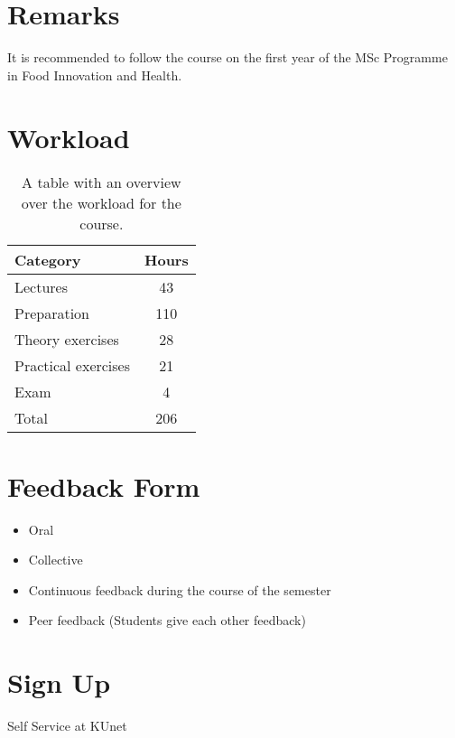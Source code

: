 \section{Remarks}
It is recommended to follow the course on the first year of the MSc Programme in Food Innovation and Health.

\section{Workload}
\begin{table}
    \centering
    \caption{A table with an overview over the workload for the course.}
    \label{tab:workload}
    \begin{tabular}{ l | c}
        \textbf{Category} & \textbf{Hours} \\ 
        \hline
        Lectures & 43 \\ 

        Preparation & 110 \\

        Theory exercises & 28 \\ 

        Practical exercises & 21 \\ 

        Exam & 4 \\ 
        \hline
        Total & 206 \\ 
    \end{tabular}
\end{table}

\section{Feedback Form}
\begin{highlight}
    \begin{itemize}
        \item Oral
        \item Collective
        \item Continuous feedback during the course of the semester
        \item Peer feedback (Students give each other feedback)
    \end{itemize}
\end{highlight}

\section{Sign Up}
Self Service at KUnet

